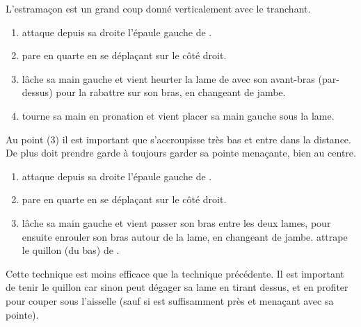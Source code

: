 \begin{coup}[Estramaçon]

L'estramaçon est un grand coup donné verticalement avec le tranchant.
\end{coup}


\begin{technique}

\begin{enumerate}
	\item \A attaque depuis sa droite l'épaule gauche de \D.
	\item \D pare en quarte en se déplaçant sur le côté droit.
	\item \D lâche sa main gauche et vient heurter la lame de \A avec son avant-bras (par-dessus) pour la rabattre sur son bras, en changeant de jambe.
	\item \D tourne sa main en pronation et vient placer sa main gauche sous la lame.
\end{enumerate}

Au point (3) il est important que \D s'accroupisse très bas et entre dans la distance.
De plus \D doit prendre garde à toujours garder sa pointe menaçante, bien au centre.

\end{technique}


\begin{technique}

\begin{enumerate}
	\item \A attaque depuis sa droite l'épaule gauche de \D.
	\item \D pare en quarte en se déplaçant sur le côté droit.
	\item \D lâche sa main gauche et vient passer son bras entre les deux lames, pour ensuite enrouler son bras autour de la lame, en changeant de jambe. \D attrape le quillon (du bas) de \A.
\end{enumerate}

Cette technique est moins efficace que la technique précédente.
Il est important de tenir le quillon car sinon \A peut dégager sa lame en tirant dessus, et en profiter pour couper sous l'aisselle (sauf si \D est suffisamment près et menaçant avec sa pointe).

\end{technique}


